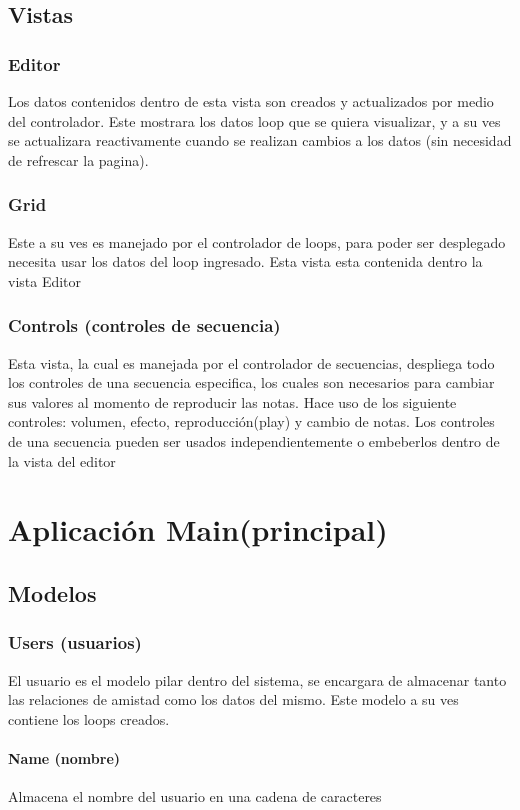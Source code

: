 \subsection{Vistas}
\subsubsection{Editor}
Los datos contenidos dentro de esta vista son creados y actualizados por medio del
controlador. Este mostrara los datos loop que se quiera visualizar, y a su ves se
actualizara reactivamente cuando se realizan cambios a los datos (sin necesidad de
refrescar la pagina).
\subsubsection{Grid}
Este a su ves es manejado por el controlador de loops, para poder ser desplegado
necesita usar los datos del loop ingresado. Esta vista esta contenida dentro
la vista Editor
\subsubsection{Controls (controles de secuencia)}
Esta vista, la cual es manejada por el controlador de secuencias, despliega todo los
controles de una secuencia especifica, los cuales son necesarios para cambiar
sus valores al momento de reproducir las notas. Hace uso de los
siguiente controles: volumen, efecto, reproducción(play) y cambio de notas. Los
controles de una secuencia pueden ser usados independientemente o embeberlos
dentro de la vista del editor

\section{Aplicación Main(principal)}

\subsection{Modelos}
\subsubsection{Users (usuarios)}
El usuario es el modelo pilar dentro del sistema, se encargara de almacenar tanto
las relaciones de amistad como los datos del mismo. Este modelo a su
ves contiene los loops creados.
\paragraph{Name (nombre)}
Almacena el nombre del usuario en una cadena de caracteres
